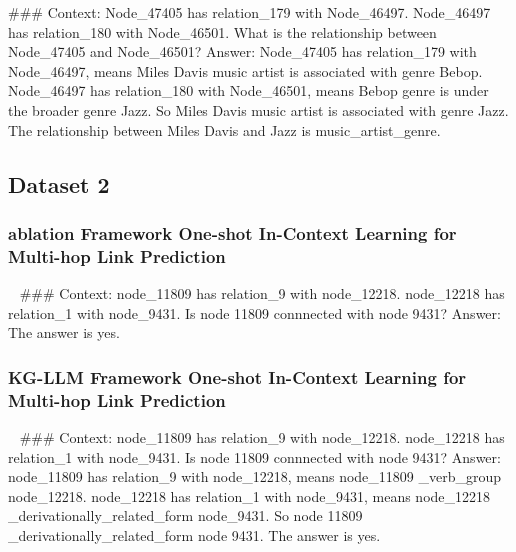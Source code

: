 \documentclass[pmlr]{jmlr}%
\begin{document}
\#\#\# Context:\newline
Node\_47405 has relation\_179 with Node\_46497. Node\_46497 has relation\_180 with Node\_46501. What is the relationship between Node\_47405 and Node\_46501?\newline
Answer:\newline
Node\_47405 has relation\_179 with Node\_46497, means Miles Davis music artist is associated with genre Bebop. Node\_46497 has relation\_180 with Node\_46501, means Bebop genre is under the broader genre Jazz. So Miles Davis music artist is associated with genre Jazz.\newline
The relationship between Miles Davis and Jazz is music\_artist\_genre. 

\newpage
\subsection{Dataset 2}

\subsubsection{ablation Framework One-shot In-Context Learning for Multi-hop Link Prediction}
\ 
\#\#\# Context:\newline
node\_11809 has relation\_9 with node\_12218. node\_12218 has relation\_1 with node\_9431. Is node 11809 connnected with node 9431?\newline
Answer:\newline
The answer is yes.

\subsubsection{KG-LLM Framework One-shot In-Context Learning for Multi-hop Link Prediction}
\ 
\#\#\# Context:\newline
node\_11809 has relation\_9 with node\_12218. node\_12218 has relation\_1 with node\_9431. Is node 11809 connnected with node 9431?\newline
Answer:\newline
node\_11809 has relation\_9 with node\_12218, means node\_11809 \_verb\_group node\_12218. node\_12218 has relation\_1 with node\_9431, means node\_12218 \_derivationally\_related\_form node\_9431. So node 11809 \_derivationally\_related\_form node 9431. The answer is yes.
\end{document}

